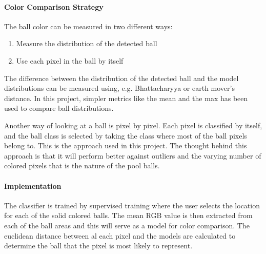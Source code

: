 \paragraph{Color Comparison Strategy}

The ball color can be measured in two different ways: 
\begin{enumerate}
  \item Measure the distribution of the detected ball
  \item Use each pixel in the ball by itself
\end{enumerate}

The difference between the distribution of the detected ball and the model distributions can be measured using, e.g. Bhattacharyya or earth mover's distance. In this project, simpler metrics like the mean and the max has been used to compare ball distributions. 

Another way of looking at a ball is pixel by pixel. Each pixel is classified by itself, and the ball class is selected by taking the class where most of the ball pixels belong to. This is the approach used in this project. The thought behind this approach is that it will perform better against outliers and the varying number of colored pixels that is the nature of the pool balls. 

\paragraph{Implementation}
The classifier is trained by supervised training where the user selects the location for each of the solid colored balls. The mean RGB value is then extracted from each of the ball areas and this will serve as a model for color comparison. 
The euclidean distance between al each pixel and the models are calculated to determine the ball that the pixel is most likely to represent.

